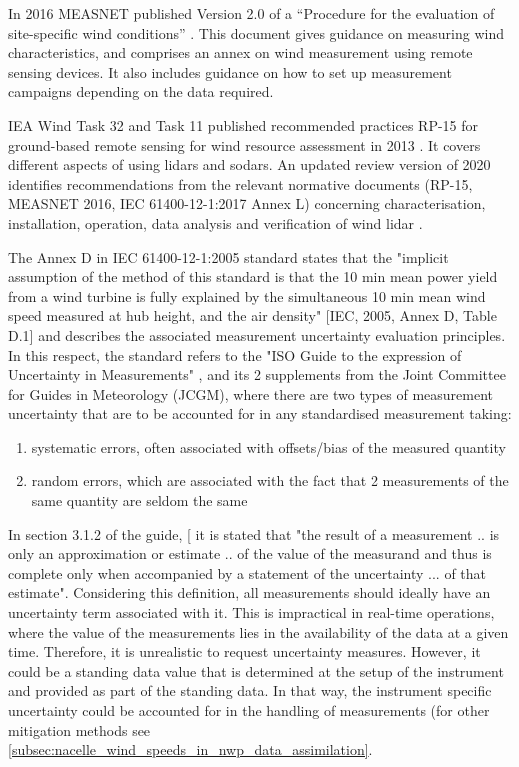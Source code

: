 In 2016 MEASNET published Version 2.0 of a “Procedure for the evaluation of site-specific wind conditions” \cite{MEASNET2016}. This document gives guidance on measuring wind characteristics, and comprises  an  annex on wind measurement using remote sensing devices. It also includes guidance on how to set up measurement campaigns depending on the data required.

IEA Wind Task 32 and Task 11 published recommended practices RP-15 for ground-based remote sensing for wind resource assessment in 2013 \cite{RP15}. It covers different aspects of using lidars and sodars. An updated review version of 2020 \cite{clifton_review_2020} identifies recommendations from the relevant normative documents (RP-15, MEASNET 2016, IEC 61400-12-1:2017 Annex L) concerning characterisation, installation, operation, data analysis and verification of wind lidar .

The Annex D in IEC 61400-12-1:2005 standard states that the "implicit assumption of the method of this standard is that the 10 min mean power yield from a wind turbine is fully explained by the simultaneous 10 min mean wind speed measured at hub height, and the air density" [IEC, 2005, Annex D, Table D.1] and describes the associated measurement uncertainty evaluation principles.  In this respect, the standard refers to the "ISO Guide to the expression of Uncertainty in Measurements" \cite{jcgm2008,jcgm2009}, and its 2 supplements \cite{jcgm2008a,jcgm2011} from the Joint Committee for Guides in Meteorology (JCGM), where there are two types of measurement uncertainty that are to be accounted for in any standardised measurement taking: 
\begin{enumerate}
    \vspace{-0.2cm}\item systematic errors, often associated with offsets/bias of the measured quantity
    \vspace{-0.4cm}\item random errors, which are associated with the fact that 2 measurements of the same quantity are seldom the same
\end{enumerate}

In section 3.1.2 of the guide, [\cite{jcgm2008a,jcgm2011} it is stated that "the result of a measurement .. is only an approximation or estimate .. of the value of the measurand and thus is complete only when accompanied by a statement of the uncertainty ... of that estimate". Considering this definition, all measurements should ideally have an uncertainty term associated with it. This is impractical in real-time operations, where the value of the measurements lies in the availability of the data at a given time. Therefore, it is unrealistic to request uncertainty measures. However, it could be a standing data value that is determined at the setup of the instrument and provided as part of the standing data. In that way, the instrument specific uncertainty could be accounted for in the handling of measurements (for other mitigation methods see \ref{subsec:nacelle_wind_speeds_in_nwp_data_assimilation}.\\ 

